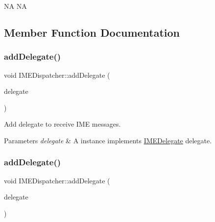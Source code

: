 NA  NA 

\subsection{Member Function Documentation}
\mbox{\label{classIMEDispatcher_a991abebe2e5ad9c8bb3dfee9b6b49157}} 
\subsubsection{\texorpdfstring{add\+Delegate()}{addDelegate()}\hspace{0.1cm}{\footnotesize\ttfamily [1/2]}}
{\footnotesize\ttfamily void I\+M\+E\+Dispatcher\+::add\+Delegate (\begin{DoxyParamCaption}\item[{\hyperlink{classIMEDelegate}{I\+M\+E\+Delegate} $\ast$}]{delegate }\end{DoxyParamCaption})\hspace{0.3cm}{\ttfamily [protected]}}



Add delegate to receive I\+ME messages. 


\begin{DoxyParams}{Parameters}
{\em delegate} & A instance implements \hyperlink{classIMEDelegate}{I\+M\+E\+Delegate} delegate. \\
\hline
\end{DoxyParams}
\mbox{\label{classIMEDispatcher_a991abebe2e5ad9c8bb3dfee9b6b49157}} 
\subsubsection{\texorpdfstring{add\+Delegate()}{addDelegate()}\hspace{0.1cm}{\footnotesize\ttfamily [2/2]}}
{\footnotesize\ttfamily void I\+M\+E\+Dispatcher\+::add\+Delegate (\begin{DoxyParamCaption}\item[{\hyperlink{classIMEDelegate}{I\+M\+E\+Delegate} $\ast$}]{delegate }\end{DoxyParamCaption})\hspace{0.3cm}{\ttfamily [protected]}}



